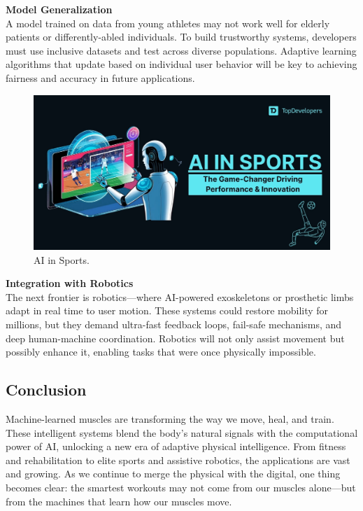 \documentclass[a4paper,10pt,twocolumn]{memoir}
\newcommand{\highlight}[1]{\textcolor{accent}{\textbf{#1}}}
\newcommand{\highlight}[1]{\textcolor{accent}{\textbf{#1}}}
\begin{document}
\highlight{Model Generalization} \\
A model trained on data from young athletes may not work well for elderly patients or differently-abled individuals. To build trustworthy systems, developers must use inclusive datasets and test across diverse populations. Adaptive learning algorithms that update based on individual user behavior will be key to achieving fairness and accuracy in future applications.
\begin{figure}[H]
  \centering
  \includegraphics[width=\linewidth]{sports.jpg}
  \caption{AI in Sports.}
  \label{fig:ai_emg}
\end{figure}
\highlight{Integration with Robotics} \\
The next frontier is robotics—where AI-powered exoskeletons or prosthetic limbs adapt in real time to user motion. These systems could restore mobility for millions, but they demand ultra-fast feedback loops, fail-safe mechanisms, and deep human-machine coordination. Robotics will not only assist movement but possibly enhance it, enabling tasks that were once physically impossible.

\subsection*{Conclusion}

Machine-learned muscles are transforming the way we move, heal, and train. These intelligent systems blend the body's natural signals with the computational power of AI, unlocking a new era of adaptive physical intelligence. From fitness and rehabilitation to elite sports and assistive robotics, the applications are vast and growing. As we continue to merge the physical with the digital, one thing becomes clear: the smartest workouts may not come from our muscles alone—but from the machines that learn how our muscles move.
\end{document}
